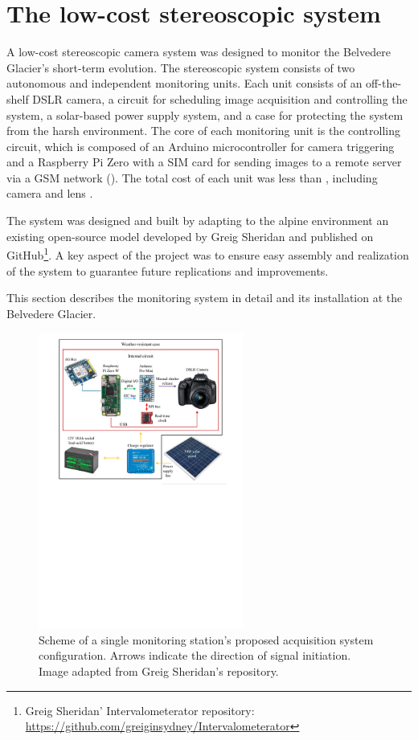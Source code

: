 \section{The low-cost stereoscopic system}\label{sec:4:system}

A low-cost stereoscopic camera system was designed to monitor the Belvedere Glacier's short-term evolution. 
The stereoscopic system consists of two autonomous and independent monitoring units. 
Each unit consists of an off-the-shelf DSLR camera, a circuit for scheduling image acquisition and controlling the system, a solar-based power supply system, and a case for protecting the system from the harsh environment. 
The core of each monitoring unit is the controlling circuit, which is composed of an Arduino microcontroller for camera triggering and a Raspberry Pi Zero with a SIM card for sending images to a remote server via a GSM network ().
The total cost of each unit was less than , including camera and lens \citep{ioli2023_replicable}.

The system was designed and built by adapting to the alpine environment an existing open-source model developed by Greig Sheridan and published on
GitHub\footnote{\label{foot:greig}Greig Sheridan' Intervalometerator repository: \url{https://github.com/greiginsydney/Intervalometerator}}.
A key aspect of the project was to ensure easy assembly and realization of the system to guarantee future replications and improvements.

This section describes the monitoring system in detail and its installation at the Belvedere Glacier.

\begin{figure}[ht!]
  \centering
  \includegraphics[width=0.6\textwidth]{schema.pdf}
  \caption{Scheme of a single monitoring station's proposed acquisition system configuration. Arrows indicate the direction of signal initiation. Image adapted
    from Greig Sheridan's repository.}
  \label{fig:4:scheme_foto}
\end{figure}


